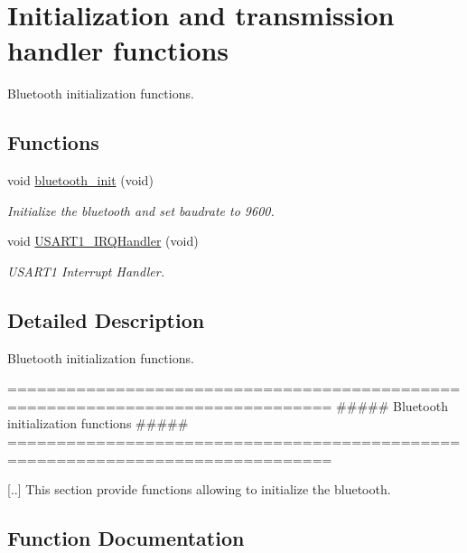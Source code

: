 \hypertarget{group___initialization}{}\section{Initialization and transmission handler functions}
\label{group___initialization}


Bluetooth initialization functions.  


\subsection*{Functions}
\begin{DoxyCompactItemize}
\item 
void \hyperlink{group___initialization_gaaa60810e0857e9e1e5b2cba80b8db3ff}{bluetooth\+\_\+init} (void)
\begin{DoxyCompactList}\small\item\em Initialize the bluetooth and set baudrate to 9600. \end{DoxyCompactList}\item 
void \hyperlink{group___initialization_ga7139cd4baabbbcbab0c1fe6d7d4ae1cc}{U\+S\+A\+R\+T1\+\_\+\+I\+R\+Q\+Handler} (void)
\begin{DoxyCompactList}\small\item\em U\+S\+A\+R\+T1 Interrupt Handler. \end{DoxyCompactList}\end{DoxyCompactItemize}


\subsection{Detailed Description}
Bluetooth initialization functions. 

\begin{DoxyVerb} ===============================================================================
         ##### Bluetooth initialization functions #####
 ===============================================================================

 [..] This section provide functions allowing to initialize the bluetooth.\end{DoxyVerb}
 

\subsection{Function Documentation}
\mbox{\label{group___initialization_gaaa60810e0857e9e1e5b2cba80b8db3ff}} 
